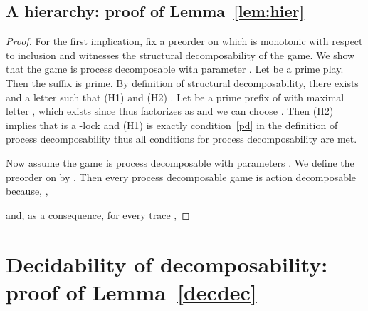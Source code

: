 \documentclass[a4paper,UKenglish]{lipics-v2016}
\newcommand{\QQ}{\mathbb{Q}}
\begin{document}
\subsection{A hierarchy: proof of Lemma~\ref{lem:hier}}

\begin{proof}
For the first implication, 
fix a preorder  on  which is monotonic with respect to inclusion
and witnesses the structural decomposability
of the game.
We show that the game is process decomposable
with parameter .
Let  be a prime play.
Then the suffix  is prime.
By definition of structural decomposability,
there exists 
and a letter  such that
(H1) 
and (H2) \QQ.
Let  be a prime prefix of  with maximal letter , which exists since 
thus  factorizes as  and we can choose .
Then (H2) implies that  is a  -lock 
and (H1) is exactly condition~\eqref{pd} in the definition of process decomposability
thus all conditions for  process decomposability are met.

Now assume the game is  process decomposable
with parameters .
We define the preorder
 on   by .
Then every  process decomposable game is 
action decomposable
because, ,

and, as a consequence, for every trace ,

\end{proof}


\section{Decidability of decomposability: proof of Lemma~\ref{decdec}}
\end{document}
